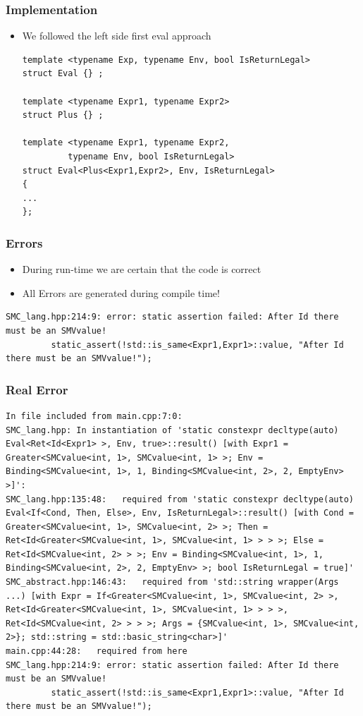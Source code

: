 \documentclass{beamer}
\begin{document}
\begin{frame}[fragile]
\frametitle{Implementation}
\begin{itemize}
\item We followed the left side first eval approach
\begin{lstlisting}
template <typename Exp, typename Env, bool IsReturnLegal>
struct Eval {} ;

template <typename Expr1, typename Expr2>
struct Plus {} ;

template <typename Expr1, typename Expr2,
         typename Env, bool IsReturnLegal>
struct Eval<Plus<Expr1,Expr2>, Env, IsReturnLegal>
{
...
};
\end{lstlisting}
\end{itemize}
\end{frame}


\begin{frame}[fragile]
\frametitle{Errors}
\begin{itemize}
\item During run-time we are certain that the code is correct
\item All Errors are generated during compile time! 
\end{itemize}
\begin{lstlisting}
SMC_lang.hpp:214:9: error: static assertion failed: After Id there must be an SMVvalue!
         static_assert(!std::is_same<Expr1,Expr1>::value, "After Id there must be an SMVvalue!");
\end{lstlisting}
\end{frame}

\begin{frame}[fragile]
\frametitle{Real Error}
\begin{tiny}
\begin{lstlisting}[basicstyle=\tiny]
In file included from main.cpp:7:0:
SMC_lang.hpp: In instantiation of 'static constexpr decltype(auto) Eval<Ret<Id<Expr1> >, Env, true>::result() [with Expr1 = Greater<SMCvalue<int, 1>, SMCvalue<int, 1> >; Env = Binding<SMCvalue<int, 1>, 1, Binding<SMCvalue<int, 2>, 2, EmptyEnv> >]':
SMC_lang.hpp:135:48:   required from 'static constexpr decltype(auto) Eval<If<Cond, Then, Else>, Env, IsReturnLegal>::result() [with Cond = Greater<SMCvalue<int, 1>, SMCvalue<int, 2> >; Then = Ret<Id<Greater<SMCvalue<int, 1>, SMCvalue<int, 1> > > >; Else = Ret<Id<SMCvalue<int, 2> > >; Env = Binding<SMCvalue<int, 1>, 1, Binding<SMCvalue<int, 2>, 2, EmptyEnv> >; bool IsReturnLegal = true]'
SMC_abstract.hpp:146:43:   required from 'std::string wrapper(Args ...) [with Expr = If<Greater<SMCvalue<int, 1>, SMCvalue<int, 2> >, Ret<Id<Greater<SMCvalue<int, 1>, SMCvalue<int, 1> > > >, Ret<Id<SMCvalue<int, 2> > > >; Args = {SMCvalue<int, 1>, SMCvalue<int, 2>}; std::string = std::basic_string<char>]'
main.cpp:44:28:   required from here
SMC_lang.hpp:214:9: error: static assertion failed: After Id there must be an SMVvalue!
         static_assert(!std::is_same<Expr1,Expr1>::value, "After Id there must be an SMVvalue!");
\end{lstlisting}
\end{tiny}
\end{frame}
\end{document}
